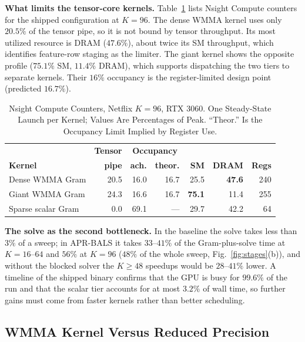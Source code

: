 \textbf{What limits the tensor-core kernels.} Table~\ref{tab:ncu} lists Nsight Compute counters for the shipped configuration at $K=96$. The dense WMMA kernel uses only $20.5\%$ of the tensor pipe, so it is not bound by tensor throughput. Its most utilized resource is DRAM ($47.6\%$), about twice its SM throughput, which identifies feature-row staging as the limiter. The giant kernel shows the opposite profile ($75.1\%$ SM, $11.4\%$ DRAM), which supports dispatching the two tiers to separate kernels. Their $16\%$ occupancy is the register-limited design point (predicted $16.7\%$).

\begin{table}[!t]
\caption{Nsight Compute Counters, Netflix $K=96$, RTX 3060. One Steady-State Launch per Kernel; Values Are Percentages of Peak. ``Theor.'' Is the Occupancy Limit Implied by Register Use.}
\label{tab:ncu}
\centering
\footnotesize
\renewcommand{\arraystretch}{1.05}
\setlength{\tabcolsep}{2.5pt}
\begin{tabular}{lrrrrrr}
\toprule
 & \textbf{Tensor} & \multicolumn{2}{c}{\textbf{Occupancy}} & & & \\
\textbf{Kernel} & \textbf{pipe} & \textbf{ach.} & \textbf{theor.} & \textbf{SM} & \textbf{DRAM} & \textbf{Regs} \\
\midrule
Dense WMMA Gram       & 20.5 & 16.0 & 16.7 & 25.5 & \textbf{47.6} & 240 \\
Giant WMMA Gram       & 24.3 & 16.6 & 16.7 & \textbf{75.1} & 11.4 & 255 \\
Sparse scalar Gram    & 0.0  & 69.1 & ---  & 29.7 & 42.2 & 64 \\
\bottomrule
\end{tabular}
\end{table}

\textbf{The solve as the second bottleneck.} In the baseline the solve takes less than $3\%$ of a sweep; in APR-BALS it takes $33$--$41\%$ of the Gram-plus-solve time at $K=16$--$64$ and $56\%$ at $K=96$ ($48\%$ of the whole sweep, Fig.~\ref{fig:stages}(b)), and without the blocked solver the $K \ge 48$ speedups would be $28$--$41\%$ lower. A timeline of the shipped binary confirms that the GPU is busy for $99.6\%$ of the run and that the scalar tier accounts for at most $3.2\%$ of wall time, so further gains must come from faster kernels rather than better scheduling.

\subsection{WMMA Kernel Versus Reduced Precision}
\label{ssec:precisioniso}

